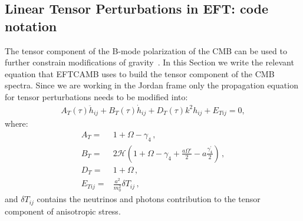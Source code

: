 \documentclass[prd,nofootinbib,showpacs]{revtex4}
\def\f{\frac}
\def\hub{{\mathcal H}}
\begin{document}
{\subsection{Linear Tensor Perturbations in EFT: code notation}\label{SubSec:TensorModes}
%
The tensor component of the B-mode polarization of the CMB can be used to further constrain modifications of gravity~\cite{Amendola:2014wma,Raveri:2014eea}.
In this Section we write the relevant equation that EFTCAMB uses to build the tensor component of the CMB spectra.
Since we are working in the Jordan frame only the propagation equation for tensor perturbations needs to be modified into:
%
\begin{align} \label{Eq:TensorEquation}
A_{T}(\tau) \ddot{h}_{ij} +B_{T}(\tau) \dot{h}_{ij} +D_{T}(\tau) k^2 h_{ij}+ E_{Tij} = 0,
\end{align}
%
where:
\begin{align}
A_{T} =& 1+\Omega -\gamma_4 \,,\nonumber \\
B_{T} =& 2\hub \left(1 + \Omega -\gamma_4 +\frac{a\Omega'}{2} -a \f{\gamma_4^\prime}{2}	 \right)\,, \nonumber \\
D_{T} =& 1+\Omega\,,\nonumber \\
E_{Tij}=& \frac{a^2}{m_0^2} \delta T _{ij} \,,
\end{align}
%
and $\delta T_{ij}$ contains the neutrinos and photons contribution to the tensor component of anisotropic stress.
%
}
\end{document}
